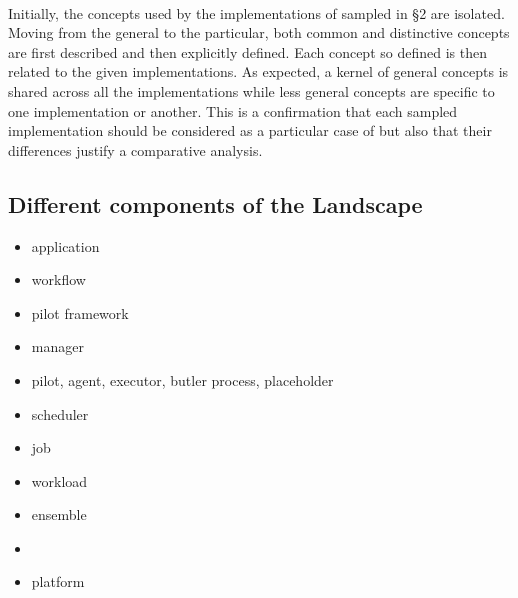 \documentclass{sig-alternate}
\begin{document}
 \\
Initially, the concepts used by the implementations of \pilotjob sampled in \S2 are isolated. Moving from the general to the particular, both common and distinctive concepts are first described and then explicitly defined. Each concept so defined is then related to the given \pilotjob implementations. As expected, a kernel of general concepts is shared across all the implementations while less general concepts are specific to one implementation or another. This is a confirmation that each sampled implementation should be considered as a particular case of \pilotjob but also that their differences justify a comparative analysis.


\subsection{Different components of the Landscape}


\begin{itemize}
	\item application
	\item workflow
	\item pilot framework
	\item manager
	\item pilot, agent, executor, butler process, placeholder
	\item scheduler
	\item job
	\item workload
	\item ensemble
	\item \computeunit
	\item platform
\end{itemize}
\end{document}
